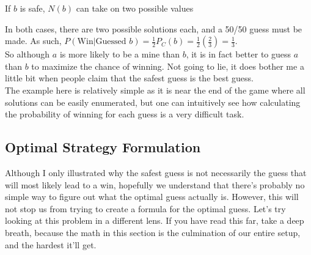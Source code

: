 If $b$ is safe, $N(b)$ can take on two possible values
\begin{center}
    \begin{minipage}{0.25\linewidth}\centering{}\end{minipage}
    \begin{minipage}{0.25\linewidth}\centering{}\end{minipage}
\end{center}
In both cases, there are two possible solutions each, and a 50/50 guess must be made. As such, $P(\text{Win}|\text{Guessed $b$})=\frac{1}{2}P_C(b)=\frac{1}{2}\left(\frac{2}{3}\right)=\frac{1}{3}$.\\

So although $a$ is more likely to be a mine than $b$, it is in fact better to guess $a$ than $b$ to maximize the chance of winning. Not going to lie, it does bother me a little bit when people claim that the safest guess is the best guess.\\

The example here is relatively simple as it is near the end of the game where all solutions can be easily enumerated, but one can intuitively see how calculating the probability of winning for each guess is a very difficult task.


\subsection{Optimal Strategy Formulation}

Although I only illustrated why the safest guess is not necessarily the guess that will most likely lead to a win, hopefully we understand that there's probably no simple way to figure out what the optimal guess actually is. However, this will not stop us from trying to create a formula for the optimal guess. Let's try looking at this problem in a different lens. If you have read this far, take a deep breath, because the math in this section is the culmination of our entire setup, and the hardest it'll get.\\

